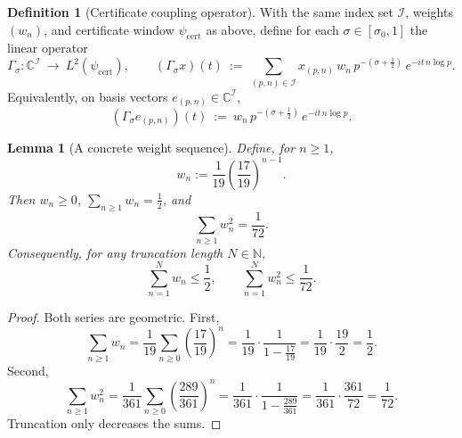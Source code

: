 \documentclass[11pt]{article}
\newtheorem{lemma}[theorem]{Lemma}
\theoremstyle{definition}
\newtheorem{definition}[theorem]{Definition}
\theoremstyle{remark}
\theoremstyle{definition}
\newcommand{\C}{\mathbb{C}}
\newcommand{\N}{\mathbb{N}}
\begin{document}
\begin{definition}[Certificate coupling operator]\label{def:certificate-operator}
With the same index set \(\mathcal I\), weights \((w_n)\), and certificate window \(\psi_{\mathrm{cert}}\) as above, define for each \(\sigma\in[\sigma_0,1]\) the linear operator
\[
  \Gamma_\sigma:\C^{\mathcal I}\ \to\ L^2(\psi_{\mathrm{cert}}),\qquad
  (\Gamma_\sigma x)(t)\ :=\ \sum_{(p,n)\in\mathcal I} x_{(p,n)}\,w_n\,p^{-(\sigma+\tfrac12)}\,e^{-it\,n\log p}.
\]
Equivalently, on basis vectors \(e_{(p,n)}\in\C^{\mathcal I}\),
\[
  (\Gamma_\sigma e_{(p,n)})(t)\ :=\ w_n\,p^{-(\sigma+\tfrac12)}\,e^{-it\,n\log p}.
\]
\end{definition}

\begin{lemma}[A concrete weight sequence]\label{lem:weights-geometric}
Define, for $n\ge 1$,
\[
  w_n:=\frac1{19}\left(\frac{17}{19}\right)^{n-1}.
\]
Then $w_n\ge 0$, $\sum_{n\ge 1} w_n=\frac12$, and
\[
  \sum_{n\ge 1} w_n^2=\frac1{72}.
\]
Consequently, for any truncation length $N\in\N$,
\[
  \sum_{n=1}^N w_n\le \frac12,\qquad \sum_{n=1}^N w_n^2\le \frac1{72}.
\]
\end{lemma}

\begin{proof}
Both series are geometric. First,
\[
  \sum_{n\ge 1} w_n=\frac1{19}\sum_{n\ge 0}\left(\frac{17}{19}\right)^n
  =\frac1{19}\cdot \frac{1}{1-\frac{17}{19}}=\frac1{19}\cdot\frac{19}{2}=\frac12.
\]
Second,
\[
  \sum_{n\ge 1} w_n^2=\frac1{361}\sum_{n\ge 0}\left(\frac{289}{361}\right)^n
  =\frac1{361}\cdot \frac{1}{1-\frac{289}{361}}
  =\frac1{361}\cdot \frac{361}{72}=\frac1{72}.
\]
Truncation only decreases the sums.
\end{proof}
\end{document}
